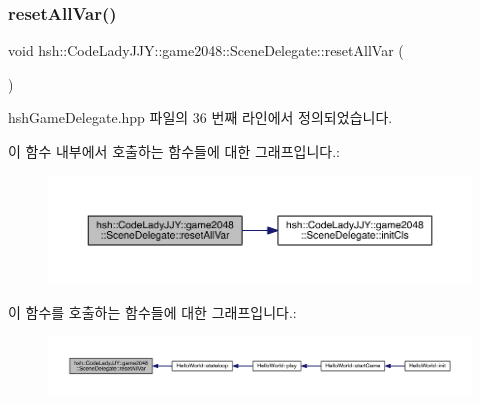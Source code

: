 \subsubsection{\texorpdfstring{reset\+All\+Var()}{resetAllVar()}}
{\footnotesize\ttfamily void hsh\+::\+Code\+Lady\+J\+J\+Y\+::game2048\+::\+Scene\+Delegate\+::reset\+All\+Var (\begin{DoxyParamCaption}{ }\end{DoxyParamCaption})\hspace{0.3cm}{\ttfamily [inline]}}



hsh\+Game\+Delegate.\+hpp 파일의 36 번째 라인에서 정의되었습니다.

이 함수 내부에서 호출하는 함수들에 대한 그래프입니다.\+:
\nopagebreak
\begin{figure}[H]
\begin{center}
\leavevmode
\includegraphics[width=350pt]{classhsh_1_1_code_lady_j_j_y_1_1game2048_1_1_scene_delegate_a07cb2b429428f54e4291c4c8dc63b4ac_cgraph}
\end{center}
\end{figure}
이 함수를 호출하는 함수들에 대한 그래프입니다.\+:
\nopagebreak
\begin{figure}[H]
\begin{center}
\leavevmode
\includegraphics[width=350pt]{classhsh_1_1_code_lady_j_j_y_1_1game2048_1_1_scene_delegate_a07cb2b429428f54e4291c4c8dc63b4ac_icgraph}
\end{center}
\end{figure}
\mbox{\label{classhsh_1_1_code_lady_j_j_y_1_1game2048_1_1_scene_delegate_acc4d5baa06662db5472e7bdee6758fd9}} 
